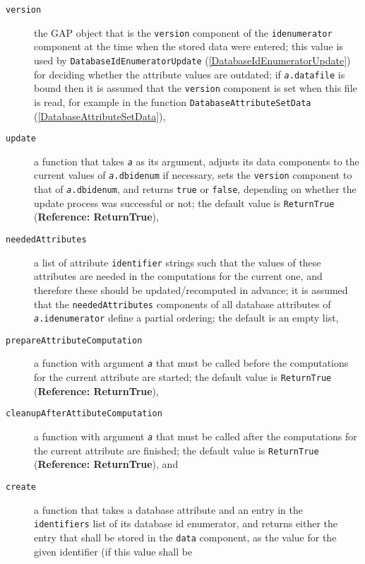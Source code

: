 \documentclass[a4paper,11pt]{report}
\begin{document}
{{{ 
\begin{description}
\item[{\texttt{version}}]  the \textsf{GAP} object that is the \texttt{version} component of the \texttt{idenumerator} component at the time when the stored data were entered; this value is used by \texttt{DatabaseIdEnumeratorUpdate} (\ref{DatabaseIdEnumeratorUpdate}) for deciding whether the attribute values are outdated; if \mbox{\texttt{\mdseries\slshape a}}\texttt{.datafile} is bound then it is assumed that the \texttt{version} component is set when this file is read, for example in the function \texttt{DatabaseAttributeSetData} (\ref{DatabaseAttributeSetData}), 
\item[{\texttt{update}}]  a function that takes \mbox{\texttt{\mdseries\slshape a}} as its argument, adjusts its data components to the current values of \mbox{\texttt{\mdseries\slshape a}}\texttt{.dbidenum} if necessary, sets the \texttt{version} component to that of \mbox{\texttt{\mdseries\slshape a}}\texttt{.dbidenum}, and returns \texttt{true} or \texttt{false}, depending on whether the update process was successful or not; the default
value is \texttt{ReturnTrue} (\textbf{Reference: ReturnTrue}), 
\item[{\texttt{neededAttributes}}]  a list of attribute \texttt{identifier} strings such that the values of these attributes are needed in the
computations for the current one, and therefore these should be
updated/recomputed in advance;  it is assumed that the \texttt{neededAttributes} components of all database attributes of \mbox{\texttt{\mdseries\slshape a}}\texttt{.idenumerator} define a partial ordering; the default is an empty list, 
\item[{\texttt{prepareAttributeComputation}}]  a function with argument \mbox{\texttt{\mdseries\slshape a}} that must be called before the computations for the current attribute are
started; the default value is \texttt{ReturnTrue} (\textbf{Reference: ReturnTrue}), 
\item[{\texttt{cleanupAfterAttibuteComputation}}]  a function with argument \mbox{\texttt{\mdseries\slshape a}} that must be called after the computations for the current attribute are
finished; the default value is \texttt{ReturnTrue} (\textbf{Reference: ReturnTrue}), and 
\item[{\texttt{create}}]  a function that takes a database attribute and an entry in the \texttt{identifiers} list of its database id enumerator, and returns either the entry that shall be
stored in the \texttt{data} component, as the value for the given identifier (if this value shall be

\end{description}}}}
\end{document}
